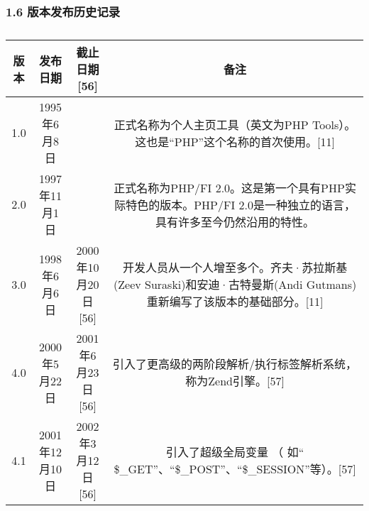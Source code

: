 \subsubsection{1.6 版本发布历史记录}
\begin{table}[ht]
\centering
\caption\label{PHP}
\begin{tabular}{|c|c|c|c}
\hline
\textbf{版本} & \textbf{发布日期} & \textbf{截止日期[56]} & \textbf{备注}\\
\hline
1.0 & 1995年6月8日 &  & 正式名称为个人主页工具（英文为PHP Tools）。这也是“PHP”这个名称的首次使用。[11]\\
\hline
2.0 & 1997年11月1日	 &  & 正式名称为PHP/FI 2.0。这是第一个具有PHP实际特色的版本。PHP/FI 2.0是一种独立的语言，具有许多至今仍然沿用的特性。\\
\hline
3.0 & 1998年6月6日 & 2000年10月20日[56] & 开发人员从一个人增至多个。齐夫·苏拉斯基(Zeev Suraski)和安迪·古特曼斯(Andi Gutmans)重新编写了该版本的基础部分。[11]\\
\hline
4.0 & 2000年5月22日 & 2001年6月23日[56] & 引入了更高级的两阶段解析/执行标签解析系统，称为Zend引擎。[57]\\
\hline
4.1 & 2001年12月10日 & 2002年3月12日[56] & 引入了超级全局变量 （ 如“ \$_GET”、“\$_POST”、“\$_SESSION”等）。[57]\\


\end{tabular}
\end{table}
